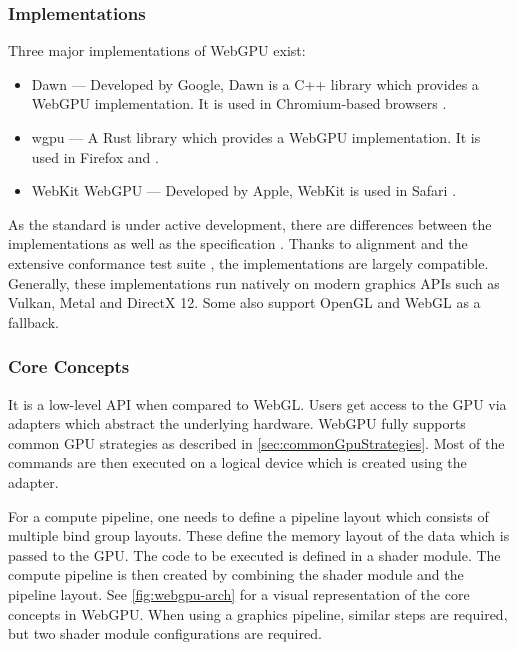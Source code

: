 \subsubsection{Implementations}

Three major implementations of WebGPU exist:

\begin{itemize}
    \item{\gls{Dawn}} — Developed by Google, \gls{Dawn} is a C++ library which provides a WebGPU implementation. It is used in Chromium-based browsers \cite{dawnImplementation}.
    \item{\gls{wgpu}} — A Rust library which provides a WebGPU implementation. It is used in Firefox and  \cite{wgpuImplementation}.
    \item{WebKit WebGPU} — Developed by Apple, WebKit is used in Safari \cite{webKitWebGPUImplementation}.
\end{itemize}

As the standard is under active development, there are differences between the implementations as well as the specification \cite{wgpuStandardDeviation}. Thanks to alignment and the extensive conformance test suite \cite{WebGPUConformanceTestSuite}, the implementations are largely compatible. Generally, these implementations run natively on modern graphics \glspl{API} such as \gls{Vulkan}, \gls{Metal} and \gls{DirectX 12}. Some also support \gls{OpenGL} and \gls{WebGL} as a fallback.

\subsubsection{Core Concepts}

It is a low-level \gls{API} when compared to \gls{WebGL}. Users get access to the \gls{GPU} via adapters which abstract the underlying hardware. WebGPU fully supports common \gls{GPU} strategies as described in \autoref{sec:commonGpuStrategies}. Most of the commands are then executed on a logical device which is created using the adapter.

For a compute pipeline, one needs to define a pipeline layout which consists of multiple bind group layouts. These define the memory layout of the data which is passed to the \gls{GPU}. The code to be executed is defined in a shader module. The compute pipeline is then created by combining the shader module and the pipeline layout. See \autoref{fig:webgpu-arch} for a visual representation of the core concepts in WebGPU. When using a graphics pipeline, similar steps are required, but two shader module configurations are required.

